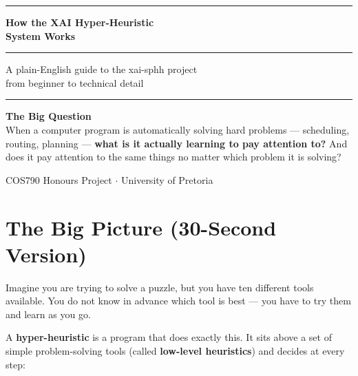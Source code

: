\documentclass[12pt, a4paper]{article}
\begin{document}
\begin{titlepage}
  \centering
  \vspace*{2cm}

  {\color{primary}\rule{\linewidth}{1.5pt}}
  \vspace{0.5cm}

  {\Huge\bfseries\color{primary} How the XAI Hyper-Heuristic\\[6pt] System Works}

  \vspace{0.4cm}
  {\color{accent}\rule{0.5\linewidth}{0.8pt}}
  \vspace{0.5cm}

  {\large\color{darkgrey} A plain-English guide to the xai-sphh project\\
  from beginner to technical detail}

  \vspace{1cm}
  {\color{primary}\rule{\linewidth}{1.5pt}}

  \vspace{2cm}

  \begin{tcolorbox}[colback=lightblue, colframe=accent, arc=6pt, boxrule=1pt,
    width=0.85\linewidth, center]
    \centering
    \textbf{\large The Big Question}\\[6pt]
    \normalsize
    When a computer program is automatically solving hard problems ---
    scheduling, routing, planning --- \textbf{what is it actually learning
    to pay attention to?} And does it pay attention to the same things
    no matter which problem it is solving?
  \end{tcolorbox}

  \vfill
  {\color{darkgrey} COS790 Honours Project $\cdot$ University of Pretoria}
\end{titlepage}

\tableofcontents
\newpage

\section{The Big Picture (30-Second Version)}

Imagine you are trying to solve a puzzle, but you have ten different
tools available. You do not know in advance which tool is best ---
you have to try them and learn as you go.

A \textbf{hyper-heuristic} is a program that does exactly this. It sits
above a set of simple problem-solving tools (called \textbf{low-level
heuristics}) and decides at every step:
\end{document}
